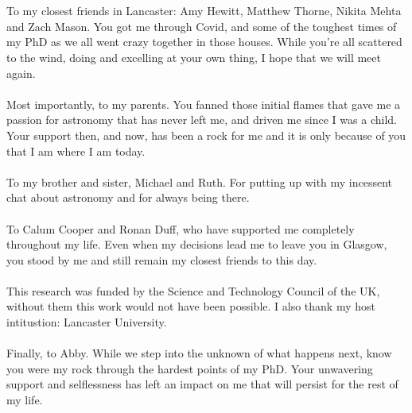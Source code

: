 \begin{acknowledgements}
\\
\\
To my closest friends in Lancaster: Amy Hewitt, Matthew Thorne, Nikita Mehta and Zach Mason. You got me through Covid, and some of the toughest times of my PhD as we all went crazy together in those houses. While you're all scattered to the wind, doing and excelling at your own thing, I hope that we will meet again.
\\
\\
Most importantly, to my parents. You fanned those initial flames that gave me a passion for astronomy that has never left me, and driven me since I was a child. Your support then, and now, has been a rock for me and it is only because of you that I am where I am today.
\\
\\
To my brother and sister, Michael and Ruth. For putting up with my incessent chat about astronomy and for always being there.
\\
\\
To Calum Cooper and Ronan Duff, who have supported me completely throughout my life. Even when my decisions lead me to leave you in Glasgow, you stood by me and still remain my closest friends to this day.
\\
\\
This research was funded by the Science and Technology Council of the UK, without them this work would not have been possible. I also thank my host intitustion: Lancaster University.
\\
\\
Finally, to Abby. While we step into the unknown of what happens next, know you were my rock through the hardest points of my PhD. Your unwavering support and selflessness has left an impact on me that will persist for the rest of my life.




\end{acknowledgements}




